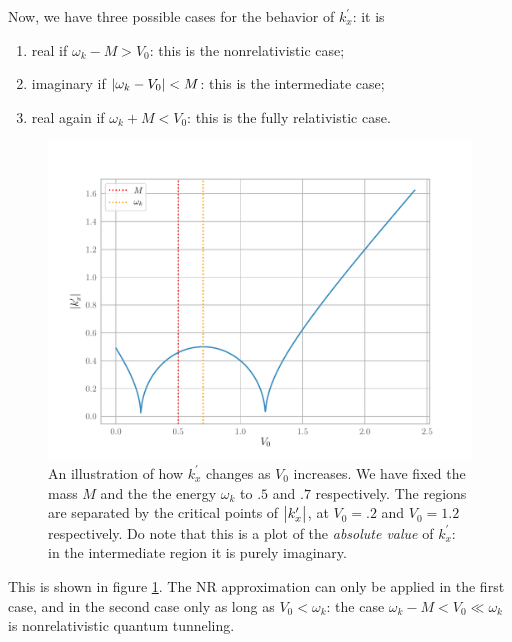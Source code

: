\documentclass[main.tex]{subfiles}
\begin{document}

Now, we have three possible cases for the behavior of \(k_x^{\prime }\): it is 
\begin{enumerate}
  \item real if \(\omega_{k} - M > V_0 \): this is the nonrelativistic case;
  \item imaginary if \(\abs{\omega_{k} - V_0 } < M\): this is the intermediate case;
  \item real again if \(\omega_{k} + M < V_0 \): this is the fully relativistic case.
\end{enumerate}

\begin{figure}[ht]
\centering
\includegraphics[width=\textwidth]{figures/primed_momentum_potential.pdf}
\caption{An illustration of how \(k_x^{\prime }\) changes as \(V_0 \) increases. We have fixed the mass \(M\) and the the energy \(\omega_{k}\) to \(\num{.5}\) and \(\num{.7}\) respectively. The regions are separated by the critical points of \(\abs{k_x'}\), at \(V_0 = \num{.2}\) and \(V_0 = \num{1.2}\) respectively. Do note that this is a plot of the \emph{absolute value} of \(k_x^{\prime }\): in the intermediate region it is purely imaginary.}
\label{fig:primed_momentum_potential}
\end{figure}

This is shown in figure \ref{fig:primed_momentum_potential}.
The NR approximation can only be applied in the first case, and in the second case only as long as \(V_0 < \omega_{k}\): the case \(\omega_{k} - M < V_0 \ll \omega_{k}\) is nonrelativistic quantum tunneling. 
\end{document}
